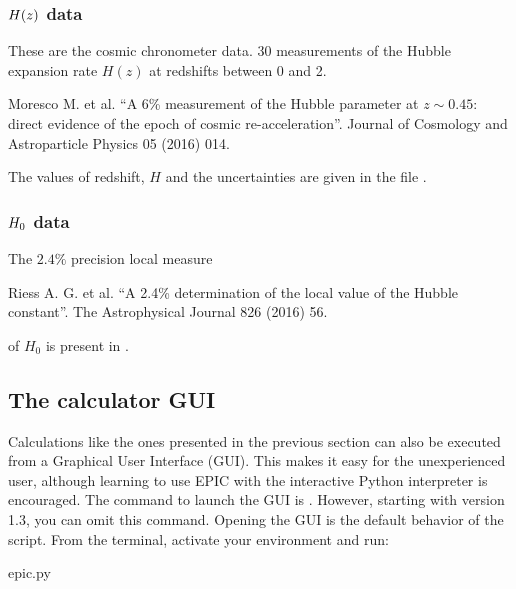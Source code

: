 \documentclass[letterpaper,12pt,english]{sphinxhowto}
\begin{document}
\subsubsection{\protect\(H(z)\protect\) data}
\label{\detokenize{thedata:data}}
These are the cosmic chronometer data.
30 measurements of the Hubble expansion rate \(H(z)\) at redshifts between
0 and 2. %
\begin{footnote}[10]\sphinxAtStartFootnote
Moresco M. et al. “A 6\% measurement of the Hubble parameter at \(z \sim 0.45\): direct evidence of the epoch of cosmic re-acceleration”. Journal of Cosmology and Astroparticle Physics 05 (2016) 014.
%
\end{footnote}
The values of redshift, \(H\) and the uncertainties are given in the file
.


\subsubsection{\protect\(H_0\protect\) data}
\label{\detokenize{thedata:id11}}
The \(2.4\%\) precision local measure %
\begin{footnote}[11]\sphinxAtStartFootnote
Riess A. G. et al. “A 2.4\% determination of the local value of the Hubble constant”. The Astrophysical Journal 826 (2016) 56.
%
\end{footnote} of \(H_0\) is present in
.


\subsection{The calculator GUI}
\label{\detokenize{calculator_gui::doc}}\label{\detokenize{calculator_gui:the-calculator-gui}}
Calculations like the ones presented in the previous section can also be
executed from a Graphical User Interface (GUI).
This makes it easy for the unexperienced user, although learning to use EPIC
with the interactive Python interpreter is encouraged.
The command to launch the GUI is .
However, starting with version 1.3, you can omit this command.
Opening the GUI is the default behavior of the script.
From the terminal, activate your environment and run:

%
\begin{sphinxVerbatim}[commandchars=\\\{\}]
\PYGZdl{} epic.py
\end{sphinxVerbatim}
\end{document}
